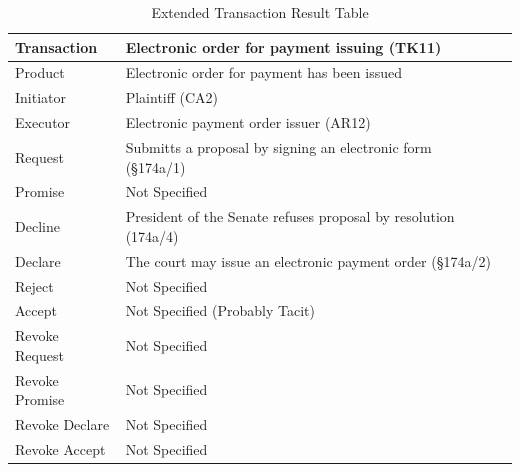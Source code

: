 \begin{landscape}
\begin{table}[h]
\caption{Extended Transaction Result Table}
\label{tab:etrt}
\begin{tabular}{|l||l|l|}
\hline
Transaction  &  Electronic order for payment issuing (TK11) \\ \hline
Product      &  Electronic order for payment has been issued \\ \hline
Initiator      & Plaintiff (CA2) \\ \hline
Executor       &  Electronic payment order issuer (AR12) \\ \hline
Request        & Submitts a proposal by signing an electronic form (\S174a/1)
  \\ \hline
Promise        &    Not Specified   \\ \hline
Decline        & President of the Senate refuses proposal by resolution (174a/4)  \\ \hline
Declare        &  The court may issue an electronic payment order (\S174a/2)  \\ \hline
Reject         &  Not Specified   \\ \hline
Accept         & Not Specified (Probably Tacit) \\ \hline
Revoke Request & Not Specified \\ \hline
Revoke Promise & Not Specified  \\ \hline
Revoke Declare & Not Specified      \\ \hline
Revoke Accept  &  Not Specified \\ \hline
\end{tabular}
\end{table}


\end{landscape}
